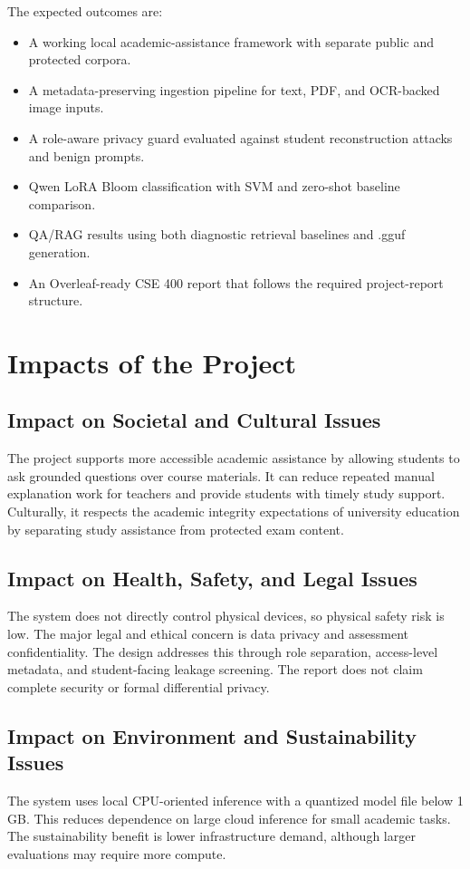 The expected outcomes are:
\begin{itemize}
    \item A working local academic-assistance framework with separate public and protected corpora.
    \item A metadata-preserving ingestion pipeline for text, PDF, and OCR-backed image inputs.
    \item A role-aware privacy guard evaluated against student reconstruction attacks and benign prompts.
    \item Qwen LoRA Bloom classification with SVM and zero-shot baseline comparison.
    \item QA/RAG results using both diagnostic retrieval baselines and \qwenmodel{}.gguf generation.
    \item An Overleaf-ready CSE 400 report that follows the required project-report structure.
\end{itemize}

\section{Impacts of the Project}

\subsection{Impact on Societal and Cultural Issues}
The project supports more accessible academic assistance by allowing students to ask grounded questions over course materials. It can reduce repeated manual explanation work for teachers and provide students with timely study support. Culturally, it respects the academic integrity expectations of university education by separating study assistance from protected exam content.

\subsection{Impact on Health, Safety, and Legal Issues}
The system does not directly control physical devices, so physical safety risk is low. The major legal and ethical concern is data privacy and assessment confidentiality. The design addresses this through role separation, access-level metadata, and student-facing leakage screening. The report does not claim complete security or formal differential privacy.

\subsection{Impact on Environment and Sustainability Issues}
The system uses local CPU-oriented inference with a quantized model file below 1 GB. This reduces dependence on large cloud inference for small academic tasks. The sustainability benefit is lower infrastructure demand, although larger evaluations may require more compute.

